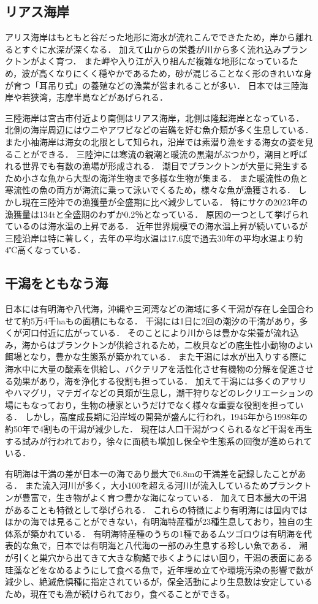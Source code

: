 \documentclass[12pt,a4j,titlepage]{ltjsarticle}
\begin{document}
\subsection{リアス海岸}
アリス海岸はもともと谷だった地形に海水が流れこんでできたため，岸から離れるとすぐに水深が深くなる．
加えて山からの栄養が川から多く流れ込みプランクトンがよく育つ．
また岬や入り江が入り組んだ複雑な地形になっているため，波が高くなりにくく穏やかであるため，砂が混じることなく形のきれいな身が育つ「耳吊り式」の養殖などの漁業が営まれることが多い．
日本では三陸海岸や若狭湾，志摩半島などがあげられる．\par
三陸海岸は宮古市付近より南側はリアス海岸，北側は隆起海岸となっている\cite{sanriku}．
北側の海岸周辺にはウニやアワビなどの岩礁を好む魚介類が多く生息している．
また小袖海岸は海女の北限として知られ，沿岸では素潜り漁をする海女の姿を見ることができる．
三陸沖には寒流の親潮と暖流の黒潮がぶつかり，潮目と呼ばれる世界でも有数の漁場が形成される．
潮目でプランクトンが大量に発生するため小さな魚から大型の海洋生物まで多様な生物が集まる．
また暖流性の魚と寒流性の魚の両方が海流に乗って泳いでくるため，様々な魚が漁獲される．
しかし現在三陸沖での漁獲量が全盛期に比べ減少している．
特にサケの2023年の漁獲量は134tと全盛期のわずか0.2％となっている．
原因の一つとして挙げられているのは海水温の上昇である．
近年世界規模での海水温上昇が続いているが三陸沿岸は特に著しく，去年の平均水温は17.6度で過去30年の平均水温より約4℃高くなっている．
\subsection{干潟をともなう海}
日本には有明海や八代海，沖縄や三河湾などの海域に多く干潟が存在し全国合わせて約5万4千haもの面積にもなる\cite{higata}．
干潟には1日に2回の潮汐の干満があり，多くが河口付近に広がっている．
そのことにより川からは豊かな栄養が流れ込み，海からはプランクトンが供給されるため，二枚貝などの底生性小動物のよい餌場となり，豊かな生態系が築かれている．
また干潟には水が出入りする際に海水中に大量の酸素を供給し、バクテリアを活性化させ有機物の分解を促進させる効果があり，海を浄化する役割も担っている．
加えて干潟には多くのアサリやハマグリ，マテガイなどの貝類が生息し，潮干狩りなどのレクリエーションの場にもなっており，生物の棲家というだけでなく様々な重要な役割を担っている．
しかし，高度成長期に沿岸域の開発が盛んに行われ，1945年から1998年の約50年で4割もの干潟が減少した．
現在は人口干潟がつくられるなど干潟を再生する試みが行われており，徐々に面積も増加し保全や生態系の回復が進められている．\par
有明海は干満の差が日本一の海であり最大で6.8mの干満差を記録したことがある\cite{ariake}．
また流入河川が多く，大小100を超える河川が流入しているためプランクトンが豊富で，生き物がよく育つ豊かな海になっている．
加えて日本最大の干潟があることも特徴として挙げられる．
これらの特徴により有明海には国内ではほかの海では見ることができない，有明海特産種が23種生息しており，独自の生体系が築かれている．
有明海特産種のうちの1種であるムツゴロウは有明海を代表的な魚で，日本では有明海と八代海の一部のみ生息する珍しい魚である．
潮が引くと巣穴から出てきて大きな胸鰭で歩くようにはい回り，干潟の表面にある珪藻などをなめるようにして食べる魚で，近年埋め立てや環境汚染の影響で数が減少し、絶滅危惧種に指定されているが，保全活動により生息数は安定しているため，現在でも漁が続けられており，食べることができる。
\end{document}
